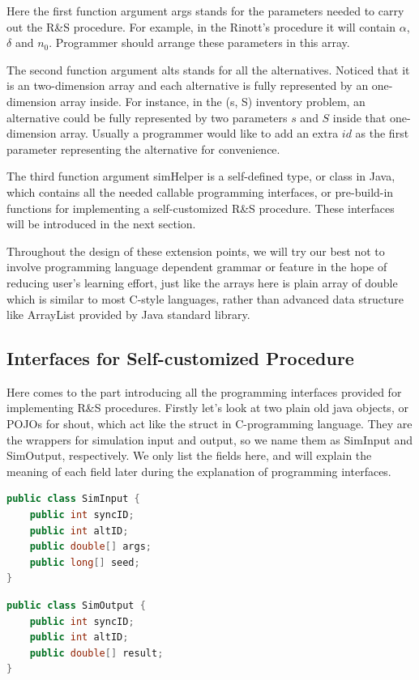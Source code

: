 \documentclass[12pt,a4]{report}
\begin{document}
Here the first function argument args stands for the parameters needed to carry out the R\&S procedure. For example, in the Rinott's procedure it will contain $\alpha$, $\delta$ and $n_0$. Programmer should arrange these parameters in this array.

The second function argument alts stands for all the alternatives. Noticed that it is an two-dimension array and each alternative is fully represented by an one-dimension array inside. For instance, in the (s, S) inventory problem, an alternative could be fully represented by two parameters $s$ and $S$ inside that one-dimension array. Usually a programmer would like to add an extra $id$ as the first parameter representing the alternative for convenience.

The third function argument simHelper is a self-defined type, or class in Java, which contains all the needed callable programming interfaces, or pre-build-in functions for implementing a self-customized R\&S procedure. These interfaces will be introduced in the next section.

Throughout the design of these extension points, we will try our best not to involve programming language dependent grammar or feature in the hope of reducing user's learning effort, just like the arrays here is plain array of double which is similar to most C-style languages, rather than advanced data structure like ArrayList provided by Java standard library.

\subsection{Interfaces for Self-customized Procedure}

Here comes to the part introducing all the programming interfaces provided for implementing R\&S procedures. Firstly let's look at two plain old java objects, or POJOs for shout, which act like the struct in C-programming language. They are the wrappers for simulation input and output, so we name them as SimInput and SimOutput, respectively. We only list the fields here, and will explain the meaning of each field later during the explanation of programming interfaces.

\begin{lstlisting}[language=Java]
public class SimInput {
	public int syncID;
	public int altID;
	public double[] args;
	public long[] seed;
}
\end{lstlisting}

\begin{lstlisting}[language=Java]
public class SimOutput {
	public int syncID;
	public int altID;
	public double[] result;
}
\end{lstlisting}
\end{document}
